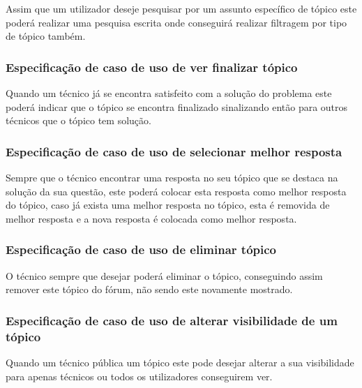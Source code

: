 Assim que um utilizador deseje pesquisar por um assunto específico de tópico este poderá realizar uma 
pesquisa escrita onde conseguirá realizar filtragem por tipo de tópico também.




\subsubsection{Especificação de caso de uso de ver finalizar tópico}

Quando um técnico já se encontra satisfeito com a solução do problema este poderá indicar que o tópico se 
encontra finalizado sinalizando então para outros técnicos que o tópico tem solução.



\newpage

\subsubsection{Especificação de caso de uso de selecionar melhor resposta}

Sempre que o técnico encontrar uma resposta no seu tópico que se destaca na solução da sua questão, 
este poderá colocar esta resposta como melhor resposta do tópico, caso já exista uma melhor resposta no 
tópico, esta é removida de melhor resposta e a nova resposta é colocada como melhor resposta.



\newpage

\subsubsection{Especificação de caso de uso de eliminar tópico}

O técnico sempre que desejar poderá eliminar o tópico, conseguindo assim remover este tópico do fórum, 
não sendo este novamente mostrado.



\subsubsection{Especificação de caso de uso de alterar visibilidade de um tópico}

Quando um técnico pública um tópico este pode desejar alterar a sua visibilidade para apenas técnicos ou 
todos os utilizadores conseguirem ver.

